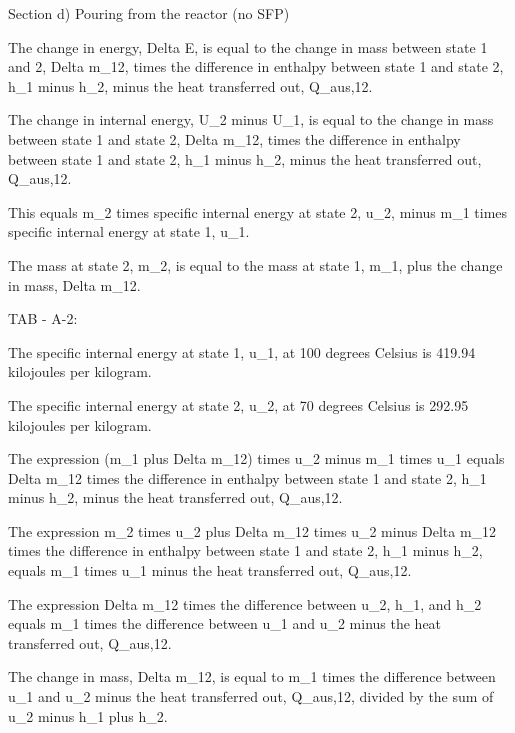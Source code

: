 Section d) Pouring from the reactor (no SFP)

The change in energy, Delta E, is equal to the change in mass between state 1 and 2, Delta m_12, times the difference in enthalpy between state 1 and state 2, h_1 minus h_2, minus the heat transferred out, Q_aus,12.

The change in internal energy, U_2 minus U_1, is equal to the change in mass between state 1 and state 2, Delta m_12, times the difference in enthalpy between state 1 and state 2, h_1 minus h_2, minus the heat transferred out, Q_aus,12.

This equals m_2 times specific internal energy at state 2, u_2, minus m_1 times specific internal energy at state 1, u_1.

The mass at state 2, m_2, is equal to the mass at state 1, m_1, plus the change in mass, Delta m_12.

TAB - A-2:

The specific internal energy at state 1, u_1, at 100 degrees Celsius is 419.94 kilojoules per kilogram.

The specific internal energy at state 2, u_2, at 70 degrees Celsius is 292.95 kilojoules per kilogram.

The expression (m_1 plus Delta m_12) times u_2 minus m_1 times u_1 equals Delta m_12 times the difference in enthalpy between state 1 and state 2, h_1 minus h_2, minus the heat transferred out, Q_aus,12.

The expression m_2 times u_2 plus Delta m_12 times u_2 minus Delta m_12 times the difference in enthalpy between state 1 and state 2, h_1 minus h_2, equals m_1 times u_1 minus the heat transferred out, Q_aus,12.

The expression Delta m_12 times the difference between u_2, h_1, and h_2 equals m_1 times the difference between u_1 and u_2 minus the heat transferred out, Q_aus,12.

The change in mass, Delta m_12, is equal to m_1 times the difference between u_1 and u_2 minus the heat transferred out, Q_aus,12, divided by the sum of u_2 minus h_1 plus h_2.